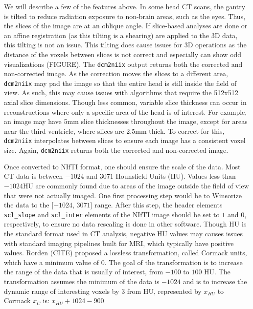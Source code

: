 \documentclass[]{elsarticle} %
\begin{document}
We will describe a few of the features above. In some head CT scans, the
gantry is tilted to reduce radiation exposure to non-brain areas, such
as the eyes. Thus, the slices of the image are at an oblique angle. If
slice-based analyses are done or an affine registration (as this tilting
is a shearing) are applied to the 3D data, this tilting is not an issue.
This tilting does cause issues for 3D operations as the distance of the
voxels between slices is not correct and especially can show odd
visualizations (FIGURE). The \texttt{dcm2niix} output returns both the
corrected and non-corrected image. As the correction moves the slices to
a different area, \texttt{dcm2niix} may pad the image so that the entire
head is still inside the field of view. As such, this may cause issues
with algorithms that require the 512x512 axial slice dimensions. Though
less common, variable slice thickness can occur in reconstructions where
only a specific area of the head is of interest. For example, an image
may have 5mm slice thicknesses throughout the image, except for areas
near the third ventricle, where slices are 2.5mm thick. To correct for
this, \texttt{dcm2niix} interpolates between slices to ensure each image
has a consistent voxel size. Again, \texttt{dcm2niix} returns both the
corrected and non-corrected image.

Once converted to NIfTI format, one should ensure the scale of the data.
Most CT data is between \(-1024\) and \(3071\) Hounsfield Units (HU).
Values less than \(-1024\)HU are commonly found due to areas of the
image outside the field of view that were not actually imaged. One first
processing step would be to Winsorize the data to the {[}\(-1024\),
\(3071\){]} range. After this step, the header elements
\texttt{scl\_slope} and \texttt{scl\_inter} elements of the NIfTI image
should be set to \(1\) and \(0\), respectively, to ensure no data
rescaling is done in other software. Though HU is the standard format
used in CT analysis, negative HU values may causes issues with standard
imaging pipelines built for MRI, which typically have positive values.
Rorden (CITE) proposed a lossless transformation, called Cormack units,
which have a minimum value of \(0\). The goal of the transformation is
to increase the range of the data that is usually of interest, from
\(-100\) to \(100\) HU. The transformation assumes the minimum of the
data is \(-1024\) and is to increase the dynamic range of interesting
voxels by 3 from HU, represented by \(x_{HU}\) to Cormack \(x_{C}\) is:
\(x_{HU} + 1024 - 900\)
\end{document}
